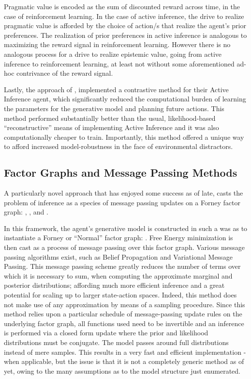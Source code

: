 \documentclass[onecolumn]{IEEEtran}
\begin{document}
Pragmatic value is encoded as the sum of discounted reward across time, in the case of reinforcement learning. In the case of active inference, the drive to realize pragmatic value is afforded by the choice of action/s that realize the agent's prior preferences. The realization of prior preferences in active inference is analogous to maximizing the reward signal in reinforcement learning. However there is no analogous process for a drive to realize epistemic value, going from active inference to reinforcement learning, at least not without some aforementioned ad-hoc contrivance of the reward signal. 

Lastly, the approach of \textcite{Contrastive-AIF}, implemented a contrastive method for their Active Inference agent, which significantly reduced the computational burden of learning the parameters for the generative model and planning future actions. This method performed substantially better than the usual, likelihood-based ``reconstructive'' means of implementing Active Inference and it was also computationally cheaper to train. Importantly, this method offered a unique way to afford increased model-robustness in the face of environmental distractors. 

\subsection{Factor Graphs and Message Passing Methods}

A particularly novel approach that has enjoyed some success as of late, casts the problem of inference as a species of message passing updates on a Forney factor graph: \textcite{Factor-Graph-Approach-Automated-Design-Bayesian-Algos}, \textcite{Simulating-AIF-By-Message-Passing}, \textcite{Factor-Graph-Desc-Deep-Temp-AIF} and \textcite{Reactive-MP}. 

In this framework, the agent's generative model is constructed in such a was as to instantiate a Forney or ``Normal'' factor graph: \textcite{Codes-on-Graphs}. Free Energy minimization is then cast as a process of message passing over this factor graph. Various message passing algorithms exist, such as Belief Propagation and Variational Message Passing. This message passing scheme greatly reduces the number of terms over which it is necessary to sum, when computing the approximate marginal and posterior distributions; affording much more efficient inference and a great potential for scaling up to larger state-action spaces. Indeed, this method does not make use of any approximation by means of a sampling procedure. Since this method relies upon a particular schedule of message-passing update rules on the underlying factor graph, all functions used need to be invertible and an inference is performed via a closed form update where the prior and likelihood distributions must be conjugate. The model passes around full distributions instead of mere samples. This results in a very fast and efficient implementation - when applicable, but the issue is that it is not a completely generic method as of yet, owing to the many assumptions as to the model structure just enumerated. 
\end{document}
